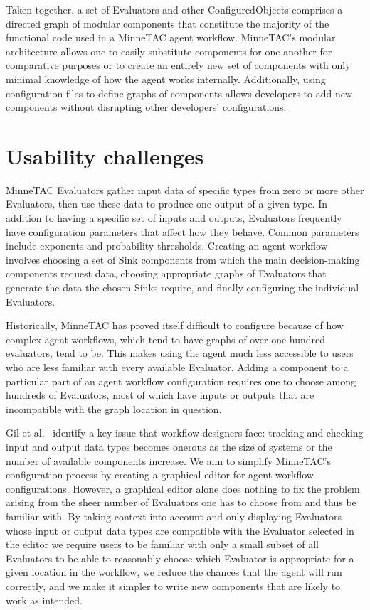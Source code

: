 \documentclass{article}
\begin{document}
Taken together, a set of Evaluators and other ConfiguredObjects comprises
a directed graph of modular components that constitute the majority
of the functional code used in a MinneTAC agent workflow.  MinneTAC's
modular architecture allows one to easily substitute components for one
another for comparative purposes or to create an entirely new set of
components with only minimal knowledge of how the agent works internally.
Additionally, using configuration files to define graphs of components
allows developers to add new components without disrupting other
developers' configurations.

\section{Usability challenges}

MinneTAC Evaluators gather input data of specific types from zero or
more other Evaluators, then use these data to produce one output of a
given type.  In addition to having a specific set of inputs and outputs,
Evaluators frequently have configuration parameters that affect how they
behave.  Common parameters include exponents and probability thresholds.
Creating an agent workflow involves choosing a set of Sink components
from which the main decision-making components request data, choosing
appropriate graphs of Evaluators that generate the data the chosen Sinks
require, and finally configuring the individual Evaluators.~\cite{Collins08TR}

Historically, MinneTAC has proved itself difficult to configure because of
how complex agent workflows, which tend to have graphs of over one hundred
evaluators, tend to be.  This makes using the agent much less accessible
to users who are less familiar with every available Evaluator.  Adding a
component to a particular part of an agent workflow configuration requires
one to choose among hundreds of Evaluators, most of which have inputs
or outputs that are incompatible with the graph location in question.

Gil et al.~\cite{gil2010wings} identify a key issue that workflow
designers face: tracking and checking input and output data types
becomes onerous as the size of systems or the number of available
components increase.  We aim to simplify MinneTAC's configuration
process by creating a graphical editor for agent workflow configurations.
However, a graphical editor alone does nothing to fix the problem arising
from the sheer number of Evaluators one has to choose from and thus
be familiar with.  By taking context into account and only displaying
Evaluators whose input or output data types are compatible with the
Evaluator selected in the editor we require users to be familiar with
only a small subset of all Evaluators to be able to reasonably choose
which Evaluator is appropriate for a given location in the workflow,
we reduce the chances that the agent will run correctly, and we make it
simpler to write new components that are likely to work as intended.
\end{document}
